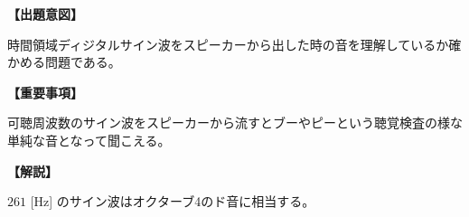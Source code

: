 \noindent \textbf{【出題意図】}

\noindent 時間領域ディジタルサイン波をスピーカーから出した時の音を理解しているか確かめる問題である。

\vspace{1em}
\noindent \textbf{【重要事項】}

\bigskip
\noindent\quad 可聴周波数のサイン波をスピーカーから流すとブーやピーという聴覚検査の様な単純な音となって聞こえる。


\vspace{1em}
\noindent \textbf{【解説】}

\noindent $261$ [Hz] のサイン波はオクターブ4のド音に相当する。
